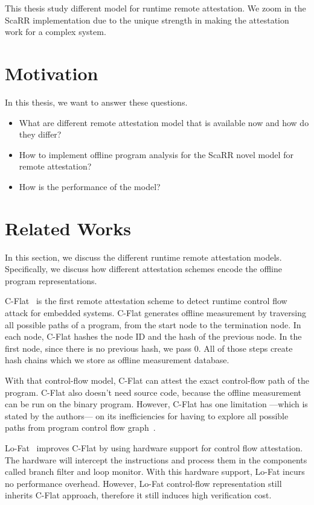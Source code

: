 This thesis study different model for runtime remote attestation. We zoom in the
ScaRR implementation due to the unique strength in making the attestation work
for a complex system.

\section{Motivation}

In this thesis, we want to answer these questions.
\begin{itemize}
    \item What are different remote attestation model that is available now and
    how do they differ?
    \item How to implement offline program analysis for the ScaRR novel model
    for remote attestation?
    \item How is the performance of the model?
\end{itemize}

\section{Related Works}

In this section, we discuss the different runtime remote attestation models.
Specifically, we discuss how different attestation schemes encode the offline
program representations.

C-Flat~\cite{aberaCFLATControlFlowAttestation2016} is the first remote
attestation scheme to detect runtime control flow attack for embedded systems.
C-Flat generates offline measurement by traversing all possible paths of a
program, from the start node to the termination node. In each node, C-Flat
hashes the node ID and the hash of the previous node. In the first node, since
there is no previous hash, we pass 0. All of those steps create hash chains
which we store as offline measurement database.

With that control-flow model, C-Flat can attest the exact control-flow path of
the program. C-Flat also doesn't need source code, because the offline
measurement can be run on the binary program. However, C-Flat has one limitation
---which is stated by the authors--- on its inefficiencies for having to explore
all possible paths from program control flow
graph~\cite{aberaCFLATControlFlowAttestation2016}.

Lo-Fat~\cite{dessoukyLOFATLowOverheadControl2017} improves C-Flat by using
hardware support for control flow attestation. The hardware will intercept the
instructions and process them in the components called branch filter and loop
monitor. With this hardware support, Lo-Fat incurs no performance overhead.
However, Lo-Fat control-flow representation still inherits C-Flat approach,
therefore it still induces high verification cost.

